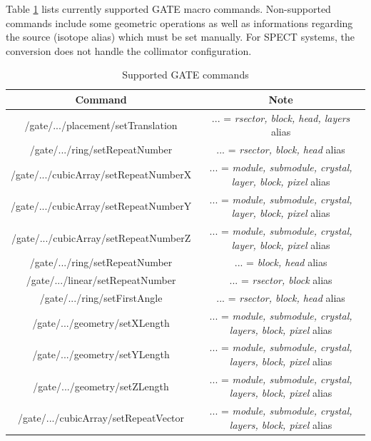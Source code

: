 \documentclass[a4paper, 11pt]{article}
\begin{document}
Table \ref{table_GATE_commands} lists currently supported GATE macro commands. Non-supported commands include some geometric operations as well as informations regarding the source (isotope alias) which must be set manually. For SPECT systems, the conversion does not handle the collimator configuration.

\begin{table} [h!]
  \small
  \caption{Supported GATE commands}
  \label{table_GATE_commands}
  \begin{center}
  \begin{tabular}{|c|c|}
  \hline
  \cellcolor{blue!25} \textbf{Command} & \cellcolor{blue!25} \textbf{Note} \\
  \hline
  \hline
  /gate/.../placement/setTranslation & ... = \textit{rsector, block, head, layers} alias  \\ \hline
  /gate/.../ring/setRepeatNumber & ... = \textit{rsector, block, head} alias  \\ \hline
  /gate/.../cubicArray/setRepeatNumberX & ... = \textit{module, submodule, crystal, layer, block, pixel} alias  \\ \hline
  /gate/.../cubicArray/setRepeatNumberY & ... = \textit{module, submodule, crystal, layer, block, pixel} alias  \\ \hline
  /gate/.../cubicArray/setRepeatNumberZ & ... = \textit{module, submodule, crystal, layer, block, pixel} alias  \\ \hline

  /gate/.../ring/setRepeatNumber & ... = \textit{block, head} alias  \\ \hline
  /gate/.../linear/setRepeatNumber & ... = \textit{rsector, block} alias  \\ \hline

  /gate/.../ring/setFirstAngle & ... = \textit{rsector, block, head} alias  \\ \hline
  /gate/.../geometry/setXLength & ... = \textit{module, submodule, crystal, layers, block, pixel} alias  \\ \hline
  /gate/.../geometry/setYLength & ... = \textit{module, submodule, crystal, layers, block, pixel} alias  \\ \hline
  /gate/.../geometry/setZLength & ... = \textit{module, submodule, crystal, layers, block, pixel} alias  \\ \hline
  /gate/.../cubicArray/setRepeatVector & ... = \textit{module, submodule, crystal, layers, block, pixel} alias  \\ \hline


\end{tabular}
\end{center}
\end{table}
\end{document}
